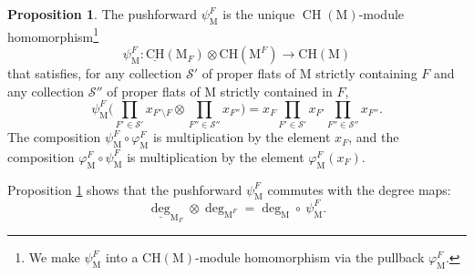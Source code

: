 \documentclass[11pt,reqno]{amsart}
\theoremstyle{definition}
\newtheorem{proposition}[theorem]{Proposition}
\theoremstyle{remark}
\renewcommand{\(}{\left(}
\renewcommand{\)}{\right)}
\newcommand{\<}{\left<}
\renewcommand{\>}{\right>}
\newcommand{\CH}{\operatorname{CH}}
\begin{document}
\begin{proposition}\label{DefinitionXPushforward}
The pushforward $\psi^F_\mathrm{M}$ is the unique $\CH(\mathrm{M})$-module homomorphism\footnote{We make $\psi^F_{\mathrm{M}}$ into a $\mathrm{CH}(\mathrm{M})$-module homomorphism via the pullback $\varphi^F_{\mathrm{M}}$.}
\[
 \psi^F_\mathrm{M}: \underline{\mathrm{CH}}(\mathrm{M}_F)  \otimes \mathrm{CH}(\mathrm{M}^F) \longrightarrow \mathrm{CH}(\mathrm{M})
 \]
that satisfies,
for any collection $\mathscr{S}'$ of proper flats of $\mathrm{M}$ strictly containing $F$
and any collection $\mathscr{S}''$ of proper flats of $\mathrm{M}$ strictly contained in $F$,
\[
\psi^F_\mathrm{M}\Bigg( \prod_{F' \in \mathscr{S}'} x_{F' \setminus F}  \otimes \prod_{F'' \in \mathscr{S}''} x_{F''}\Bigg)=x_F \prod_{F' \in \mathscr{S}'} x_{F'} \prod_{F'' \in \mathscr{S}''} x_{F''}.
\]
The composition  $\psi_\mathrm{M}^F \circ \varphi_\mathrm{M}^F$ is multiplication by the element $x_F$,
and  the composition  $\varphi_\mathrm{M}^F \circ \psi_\mathrm{M}^F$ is multiplication by the element $\varphi_\mathrm{M}^F(x_F)$.
\end{proposition}

Proposition \ref{DefinitionXPushforward} shows that the pushforward $\psi^F_\mathrm{M}$ commutes with the degree maps: %
\[
\underline{\deg}_{\mathrm{M}_F} \otimes \deg_{\mathrm{M}^F} = \deg_\mathrm{M} \circ\ \psi_\mathrm{M}^F.
\]


\end{document}
